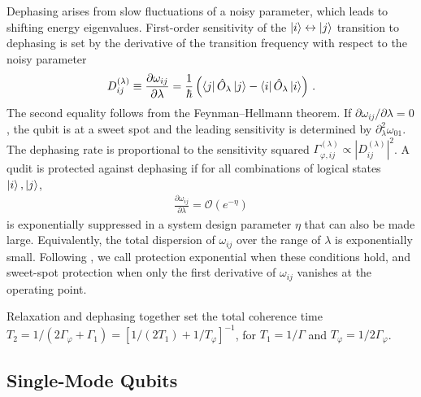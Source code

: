 Dephasing arises from slow fluctuations of a noisy parameter, which leads to shifting energy eigenvalues.
First-order sensitivity of the $\ket{i} \leftrightarrow \ket{j}$ transition to dephasing is set by the derivative of the transition frequency with respect to the noisy parameter~\cite{ithier2005}
\begin{equation}
	D_{ij}^{(\lambda)}
	\equiv
	\frac{\partial \omega_{ij}}{\partial\lambda}
	=
	\frac{1}{\hbar}
	\left(
	\bra{j} \hat O_\lambda \ket{j}
 	-
	\bra{i} \hat O_\lambda \ket{i}
	\right)
	\, .
\label{eq:dephasing-sensitivity}
\end{equation}
The second equality follows from the Feynman--Hellmann theorem. If ${\partial \omega_{ij}}/{\partial\lambda} = 0$, the qubit is at a sweet spot and the leading sensitivity is determined by $\partial_\lambda^2\omega_{01}$. The dephasing rate is proportional to the sensitivity squared $\Gamma^{(\lambda)}_{\varphi, ij } \propto |D_{ij}^{(\lambda)}|^2$.
A qudit is protected against dephasing if for all combinations of logical states $\ket{i}, \ket{j}$,
\begin{align}
    \frac{\partial \omega_{ij}}{\partial\lambda} = \mathcal O\!\left(e^{-\eta}\right)
\end{align}
is exponentially suppressed in a system design parameter $\eta$ that can also be made large.
Equivalently, the total dispersion of $\omega_{ij}$ over the range of $\lambda$ is exponentially small.
Following \textcite{gyenisMovingTransmonNoiseProtected2021b}, we call protection exponential when these conditions hold, and sweet-spot protection when only the first derivative of $\omega_{ij}$ vanishes at the operating point.

Relaxation and dephasing together set the total coherence time $T_2 = 1/(2\Gamma_\varphi +\Gamma_1)= \left[1/(2T_1) + 1/T_\varphi\right]^{-1}$, for $T_1=1/\Gamma$ and $T_\varphi=1/2\Gamma_\varphi$.




\subsection{Single-Mode Qubits}
\label{sec:single_mode_protection}

